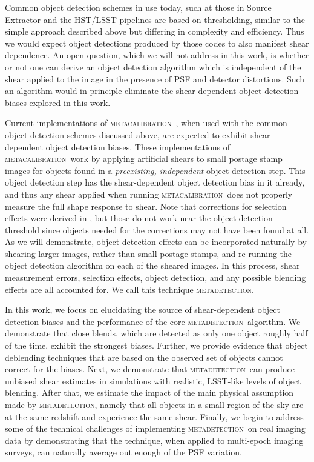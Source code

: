 \documentclass[fleqn,useAMS,usenatbib]{mnras}
\newcommand{\mcal}{\textsc{metacalibration}}
\newcommand{\mdet}{\textsc{metadetection}}
\begin{document}
Common object detection schemes in use today, such at those in Source Extractor
\citep{Bertin96} and the HST/LSST pipelines \citep{BoschHSC2018,BoschLSST2018}
are based on thresholding, similar to the simple approach described above but
differing in complexity and efficiency. Thus we would expect object detections
produced by those codes to also manifest shear dependence. An open question,
which we will not address in this work, is whether or not one can derive an object
detection algorithm which is independent of the shear applied to the image
in the presence of PSF and detector distortions. Such an algorithm would
in principle eliminate the shear-dependent object detection biases explored in this
work.

Current implementations of \mcal\ \citep[e.g.,][]{HuffMcal2017,SheldonMcal2017},
when used with the common object detection schemes discussed above, are expected to
exhibit shear-dependent object detection biases. These implementations of \mcal\ work
by applying artificial shears to small postage stamp images for objects found in
a {\em preexisting, independent} object detection step. This object detection step has the
shear-dependent object detection bias in it already, and thus any shear applied when
running \mcal\ does not properly measure the full shape response to shear. Note
that corrections for selection effects were derived in \cite{SheldonMcal2017},
but those do not work near the object detection threshold since objects needed for the
corrections may not have been found at all. As we will demonstrate, object detection
effects can be incorporated naturally by shearing larger images, rather than
small postage stamps, and re-running the object detection algorithm on each of the
sheared images. In this process, shear measurement errors, selection effects,
object detection, and any possible blending effects are all accounted for.
We call this technique \mdet.

In this work, we focus on elucidating the source of shear-dependent object detection
biases and the performance of the core \mdet\ algorithm. We demonstrate that
close blends, which are detected as only one object roughly half of the time,
exhibit the strongest biases. Further, we provide evidence that object
deblending techniques that are based on the observed set of objects cannot
correct for the biases. Next, we demonstrate that \mdet\ can produce unbiased
shear estimates in simulations with realistic, LSST-like levels of object
blending. After that, we estimate the impact of the main physical assumption
made by \mdet, namely that all objects in a small region of the sky are at the
same redshift and experience the same shear. Finally, we begin to address some
of the technical challenges of implementing \mdet\ on real imaging data by
demonstrating that the technique, when applied to multi-epoch imaging surveys,
can naturally average out enough of the PSF variation.
\end{document}
